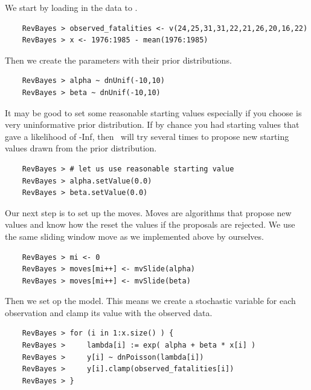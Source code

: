 We start by loading in the data to \RevBayes.
{\tt \begin{snugshade*}
\begin{lstlisting} 
    RevBayes > observed_fatalities <- v(24,25,31,31,22,21,26,20,16,22)
    RevBayes > x <- 1976:1985 - mean(1976:1985)
\end{lstlisting}
\end{snugshade*}}
Then we create the parameters with their prior distributions.
{\tt \begin{snugshade*}
\begin{lstlisting} 
    RevBayes > alpha ~ dnUnif(-10,10) 
    RevBayes > beta ~ dnUnif(-10,10)
\end{lstlisting}
\end{snugshade*}}
It may be good to set some reasonable starting values especially if you choose is very uninformative prior distribution.
If by chance you had starting values that gave a likelihood of -Inf, then \RevBayes~will try several times to propose new starting values drawn from the prior distribution.
{\tt \begin{snugshade*}
\begin{lstlisting} 
    RevBayes > # let us use reasonable starting value
    RevBayes > alpha.setValue(0.0)
    RevBayes > beta.setValue(0.0)
\end{lstlisting}
\end{snugshade*}}
Our next step is to set up the moves.
Moves are algorithms that propose new values and know how the reset the values if the proposals are rejected.
We use the same sliding window move as we implemented above by ourselves.
{\tt \begin{snugshade*}
\begin{lstlisting} 
    RevBayes > mi <- 0
    RevBayes > moves[mi++] <- mvSlide(alpha)
    RevBayes > moves[mi++] <- mvSlide(beta)
\end{lstlisting}
\end{snugshade*}}
Then we set op the model.
This means we create a stochastic variable for each observation and clamp its value with the observed data.
{\tt \begin{snugshade*}
\begin{lstlisting} 
    RevBayes > for (i in 1:x.size() ) {
    RevBayes >     lambda[i] := exp( alpha + beta * x[i] )
    RevBayes >     y[i] ~ dnPoisson(lambda[i])
    RevBayes >     y[i].clamp(observed_fatalities[i])
    RevBayes > }
\end{lstlisting}
\end{snugshade*}}
